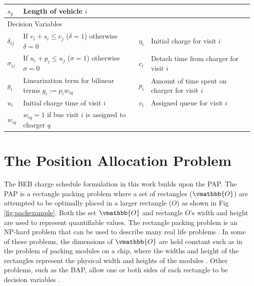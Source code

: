 \documentclass[letterpaper, 10pt, conference]{IEEEtran}
\begin{document}
\begin{table}[!t]
\begin{tabular}{l l l l}
			$s_q$        & Length of vehicle $i$                                              \\
		\hline
		\multicolumn{4}{l}{Decision Variables} \\
			$\delta_{ij}$ & If $v_i + s_i \leq v_j$ ($\delta = 1$) otherwise $\delta = 0$ &
			$\eta_i$      & Initial charge for visit $i$                                 \\
			$\sigma_{ij}$ & If $u_i + p_i \leq u_j$ ($\sigma = 1$) otherwise $\sigma = 0$ &
			$c_i$         & Detach time from charger for visit $i$                       \\
			$g_i$         & Linearization term for bilinear terms $g_i := p_i w_{iq}$     &
			$p_i$         & Amount of time spent on charger for visit $i$                \\
			$u_i$         & Initial charge time of visit $i$                             &
			$v_i$         & Assigned queue for visit $i$                                 \\
     			$w_{iq}$      & $w_{iq} = 1$ if bus visit $i$ is assigned to charger $q$       \\
			\bottomrule
	\end{tabular}
\end{table}

\section{The Position Allocation Problem}
\label{sec:positionallocationproblem}
The BEB charge schedule formulation in this work builds upon the PAP. The PAP is a rectangle packing problem where a set of rectangles ($\vmathbb{O}$) are attempted to be optimally placed in a larger rectangle ($O$) as shown in Fig \ref{fig:packexample}. Both the set $\vmathbb{O}$ and rectangle $O$'s width and height are used to represent quantifiable values. The rectangle packing problem is an NP-hard problem that can be used to describe many real life problems \cite{Bruin2013,Murata1995}. In some of these problems, the dimensions of $\vmathbb{O}$ are held constant such as in the problem of packing modules on a chip, where the widths and height of the rectangles represent the physical width and heights of the modules \cite{Murata1995}. Other problems, such as the BAP, allow one or both sides of each rectangle to be decision variables \cite{Buhrkal2010}.
\end{document}
